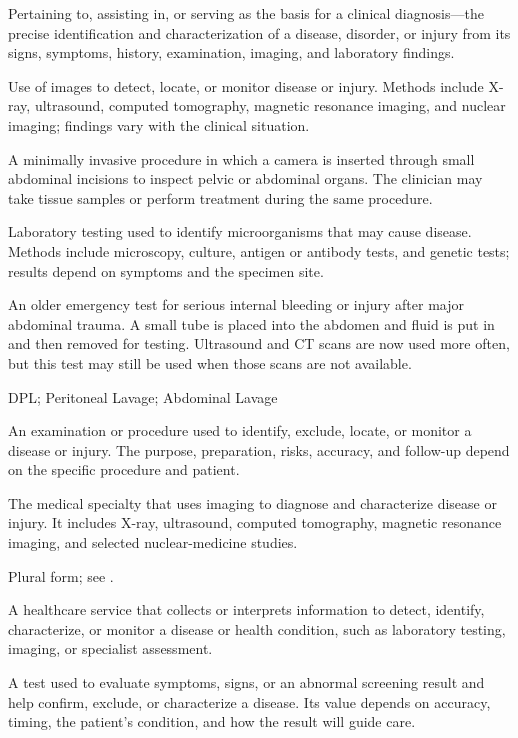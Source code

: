  Pertaining to, assisting in, or serving as the basis for a clinical diagnosis—the precise identification and characterization of a disease, disorder, or injury from its signs, symptoms, history, examination, imaging, and laboratory findings.

 Use of images to detect, locate, or monitor disease or injury. Methods include X-ray, ultrasound, computed tomography, magnetic resonance imaging, and nuclear imaging; findings vary with the clinical situation.

 A minimally invasive procedure in which a camera is inserted through small abdominal incisions to inspect pelvic or abdominal organs. The clinician may take tissue samples or perform treatment during the same procedure.

 Laboratory testing used to identify microorganisms that may cause disease. Methods include microscopy, culture, antigen or antibody tests, and genetic tests; results depend on symptoms and the specimen site.

 An older emergency test for serious internal bleeding or injury after major abdominal trauma. A small tube is placed into the abdomen and fluid is put in and then removed for testing. Ultrasound and CT scans are now used more often, but this test may still be used when those scans are not available.

\synonyms
DPL; Peritoneal Lavage; Abdominal Lavage

 An examination or procedure used to identify, exclude, locate, or monitor a disease or injury. The purpose, preparation, risks, accuracy, and follow-up depend on the specific procedure and patient.

 The medical specialty that uses imaging to diagnose and characterize disease or injury. It includes X-ray, ultrasound, computed tomography, magnetic resonance imaging, and selected nuclear-medicine studies.

 Plural form; see .

 A healthcare service that collects or interprets information to detect, identify, characterize, or monitor a disease or health condition, such as laboratory testing, imaging, or specialist assessment.

 A test used to evaluate symptoms, signs, or an abnormal screening result and help confirm, exclude, or characterize a disease. Its value depends on accuracy, timing, the patient’s condition, and how the result will guide care.

